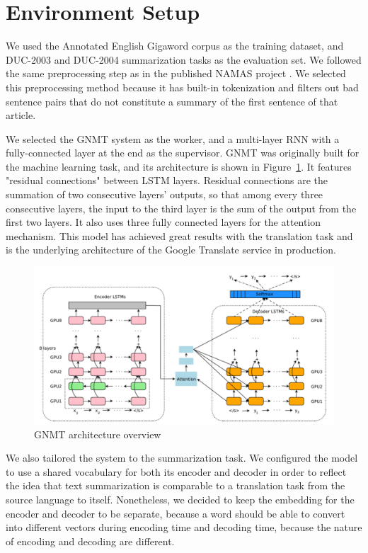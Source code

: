 \documentclass[letterpaper]{article} %
\begin{document}
\section{Environment Setup}
We used the Annotated English Gigaword corpus \cite{napoles2012annotated} as the training dataset, and DUC-2003 and DUC-2004 summarization tasks \cite{over2007duc} as the evaluation set. We followed the same preprocessing step as in the published NAMAS project \cite{rush2015neural}. We selected this preprocessing method because it has built-in tokenization and filters out bad sentence pairs that do not constitute a summary of the first sentence of that article.

We selected the GNMT system as the worker, and a multi-layer RNN with a fully-connected layer at the end as the supervisor. GNMT was originally built for the machine learning task, and its architecture is shown in Figure~\ref{fig:gnmt}. It features "residual connections" between LSTM layers. Residual connections are the summation of two consecutive layers' outputs, so that among every three consecutive layers, the input to the third layer is the sum of the output from the first two layers. It also uses three fully connected layers for the attention mechanism. This model has achieved great results with the translation task and is the underlying architecture of the Google Translate service in production.

\begin{figure}[h]
	\includegraphics[scale=0.355]{GNMT}
	\centering
	\caption{GNMT architecture overview \cite{johnson2016google}}
	\label{fig:gnmt}
\end{figure}

We also tailored the system to the summarization task. We configured the model to use a shared vocabulary for both its encoder and decoder in order to reflect the idea that text summarization is comparable to a translation task from the source language to itself. Nonetheless, we decided to keep the embedding for the encoder and decoder to be separate, because a word should be able to convert into different vectors during encoding time and decoding time, because the nature of encoding and decoding are different.
\end{document}
